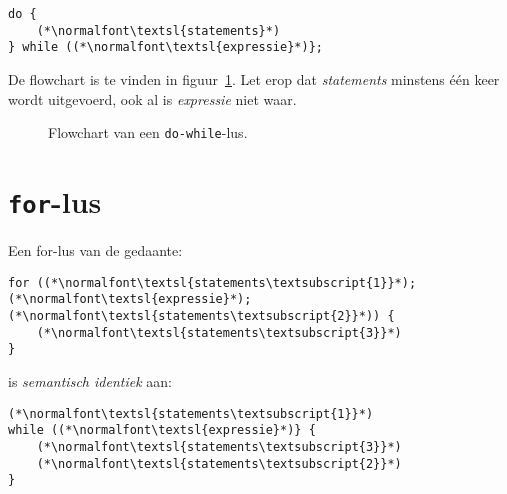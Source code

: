 \begin{lstlisting}[caption=Do-while-lus in C.]
do {
    (*\normalfont\textsl{statements}*)
} while ((*\normalfont\textsl{expressie}*)};
\end{lstlisting}

De flowchart is te vinden in figuur~\ref{fig:flodowhile}.
Let erop dat \textsl{statements} minstens \'e\'en keer wordt uitgevoerd, ook al is \textsl{expressie}
niet waar.

\begin{figure}[!ht]
\centering
{}
\caption{Flowchart van een \texttt{do-while}-lus.}
\label{fig:flodowhile}
\end{figure}


\newpage
\section{\texttt{for}-lus}

Een for-lus van de gedaante:
%
\begin{lstlisting}[caption=For-lus in C.]
for ((*\normalfont\textsl{statements\textsubscript{1}}*); (*\normalfont\textsl{expressie}*); (*\normalfont\textsl{statements\textsubscript{2}}*)) {
    (*\normalfont\textsl{statements\textsubscript{3}}*)
}
\end{lstlisting}
%
is \textsl{semantisch identiek} aan:
%
\begin{lstlisting}[caption=For-lus herschreven als while-lus in C.]
(*\normalfont\textsl{statements\textsubscript{1}}*)
while ((*\normalfont\textsl{expressie}*)} {
    (*\normalfont\textsl{statements\textsubscript{3}}*)
    (*\normalfont\textsl{statements\textsubscript{2}}*)
}
\end{lstlisting}

